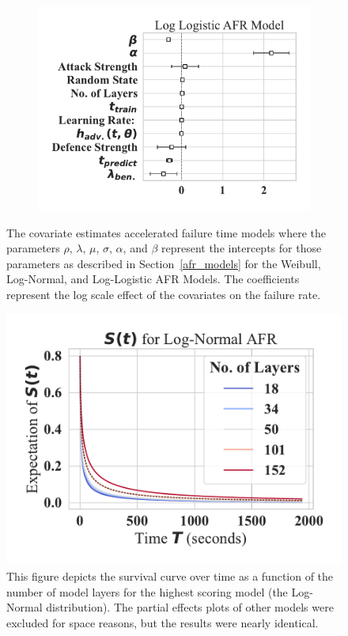 \begin{figure}
\begin{subfigure}[t]{0.3\textwidth}
        \includegraphics[width=\textwidth]{mnist/log_logistic_aft.pdf}
    \end{subfigure}
    
    \caption{The covariate estimates accelerated failure time models where the parameters $\rho$, $\lambda$, $\mu$, $\sigma$, $\alpha$, and $\beta$ represent the intercepts for those parameters as described in Section~\ref{afr_models} for the Weibull, Log-Normal, and Log-Logistic AFR Models. The coefficients represent the log scale effect of the covariates on the failure rate.}
    \label{fig:mnist_afr_models}
\end{figure}

\begin{figure}

    \centering\includegraphics[width=.5\textwidth]{mnist/log_normal_partial_effects.pdf}
   \caption{This figure depicts the survival curve over time as a function of the number of model layers for the highest scoring model (the Log-Normal distribution). The partial effects plots of other models were excluded for space reasons, but the results were nearly identical.}
    \label{fig:mnist_mnist_layers}
\end{figure}



